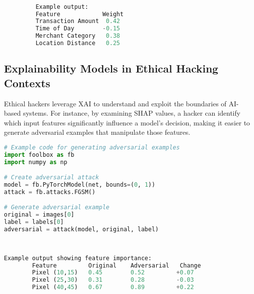 \documentclass[12pt]{article}
\begin{document}
\begin{tcolorbox}[colback=black!90!white, colframe=orange!40!black, title=Example Code for Model Robustness Testing, coltext=white]
    \begin{lstlisting}[language=Python, basicstyle=\ttfamily\color{white}, keywordstyle=\color{cyan}, commentstyle=\color{blue}, stringstyle=\color{yellow}]

         Example output:
         Feature            Weight
         Transaction Amount  0.42
         Time of Day        -0.15
         Merchant Category   0.38
         Location Distance   0.25
        \end{lstlisting}
\end{tcolorbox}
        

\subsection{Explainability Models in Ethical Hacking Contexts}
Ethical hackers leverage XAI to understand and exploit the boundaries of AI-based systems. For instance, by examining SHAP values, a hacker can identify which input features significantly influence a model's decision, making it easier to generate adversarial examples that manipulate those features.

\begin{tcolorbox}[colback=black!90!white, colframe=orange!40!black, title=Example Code for Model Robustness Testing, coltext=white]
    \begin{lstlisting}[language=Python, basicstyle=\ttfamily\color{white}, keywordstyle=\color{cyan}, commentstyle=\color{blue}, stringstyle=\color{yellow}]
# Example code for generating adversarial examples
import foolbox as fb
import numpy as np

# Create adversarial attack
model = fb.PyTorchModel(net, bounds=(0, 1))
attack = fb.attacks.FGSM()

# Generate adversarial example
original = images[0]
label = labels[0]
adversarial = attack(model, original, label)
        
        
    \end{lstlisting}
    
\end{tcolorbox}

\begin{tcolorbox}[colback=black!90!white, colframe=orange!40!black, title=Example Code for Model Robustness Testing, coltext=white]
    \begin{lstlisting}[language=Python, basicstyle=\ttfamily\color{white}, keywordstyle=\color{cyan}, commentstyle=\color{blue}, stringstyle=\color{yellow}]
        Example output showing feature importance:
        Feature         Original    Adversarial   Change
        Pixel (10,15)   0.45        0.52         +0.07
        Pixel (25,30)   0.31        0.28         -0.03
        Pixel (40,45)   0.67        0.89         +0.22
    \end{lstlisting}
    
\end{tcolorbox}
    
\end{document}
